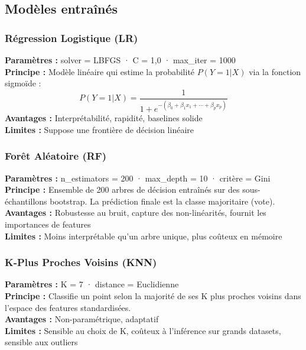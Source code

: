 \documentclass[12pt,a4paper]{article}
\begin{document}
		\subsection{Modèles entraînés}

			\subsubsection{Régression Logistique (LR)}

				\begin{tcolorbox}[infobox, title={Régression Logistique}]
				\textbf{Paramètres :} solver = LBFGS · C = 1{,}0 · max\_iter = 1000 \\
				\textbf{Principe :} Modèle linéaire qui estime la probabilité $P(Y=1 | X)$ via la fonction sigmoïde :
				$$P(Y=1|X) = \frac{1}{1 + e^{-(\beta_0 + \beta_1 x_1 + \cdots + \beta_p x_p)}}$$
				\textbf{Avantages :} Interprétabilité, rapidité, baselines solide \\
				\textbf{Limites :} Suppose une frontière de décision linéaire
				\end{tcolorbox}
			
			\subsubsection{Forêt Aléatoire (RF)}

				\begin{tcolorbox}[infobox, title={Random Forest}]
				\textbf{Paramètres :} n\_estimators = 200 · max\_depth = 10 · critère = Gini \\
				\textbf{Principe :} Ensemble de 200 arbres de décision entraînés sur des sous-échantillons bootstrap. La prédiction finale est la classe majoritaire (vote). \\
				\textbf{Avantages :} Robustesse au bruit, capture des non-linéarités, fournit les importances de features \\
				\textbf{Limites :} Moins interprétable qu'un arbre unique, plus coûteux en mémoire
				\end{tcolorbox}
			\subsubsection{K-Plus Proches Voisins (KNN)}

				\begin{tcolorbox}[infobox, title={K-Nearest Neighbors}]
				\textbf{Paramètres :} K = 7 · distance = Euclidienne \\
				\textbf{Principe :} Classifie un point selon la majorité de ses K plus proches voisins dans l'espace des features standardisées. \\
				\textbf{Avantages :} Non-paramétrique, adaptatif \\
				\textbf{Limites :} Sensible au choix de K, coûteux à l'inférence sur grands datasets, sensible aux outliers
				\end{tcolorbox}
\end{document}
